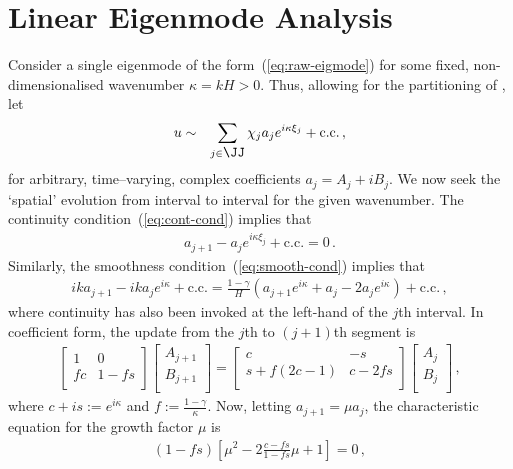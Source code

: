 \documentclass[12pt,a5paper]{article}
\begin{document}
\section{Linear Eigenmode Analysis}\label{sec:eig:modes}
Consider a single eigenmode of the form~(\ref{eq:raw-eigmode}) for some fixed, non-dimensionalised 
wavenumber $\kappa=kH>0$. 
Thus, allowing for the partitioning of \XX, let
\begin{eqnarray}
u & \sim & \sum_{j\in\JJ} \chi_j a_j e^{i\kappa\xi_j} + \text{c.c.}\,,
\end{eqnarray}
for arbitrary, time--varying, complex coefficients $a_j=A_j+iB_j$. 
We now seek the `spatial' evolution from interval to interval for the given wavenumber.
The continuity condition~(\ref{eq:cont-cond}) implies that
\begin{eqnarray}
a_{j+1} - a_j e^{i\kappa\xi_j} + \text{c.c.} = 0\,.
\end{eqnarray}
Similarly, the smoothness condition~(\ref{eq:smooth-cond}) implies that 
\begin{eqnarray}
ik a_{j+1} -ik a_j e^{i\kappa} + \text{c.c.} =  
\frac{1-\gamma}{H}\left(
a_{j+1} e^{i\kappa} + a_j - 2 a_j e^{i\kappa}
\right)
+ \text{c.c.}\,,
\end{eqnarray}
where continuity has also been invoked at the left-hand of the $j$th interval.
In coefficient form, the update from the $j$th to $(j+1)$th segment is
\begin{eqnarray}
\left[\begin{array}{cc}
1 & 0\\
fc & 1-fs\\
\end{array}\right]
\left[\begin{array}{c}
A_{j+1}\\
B_{j+1}\\
\end{array}\right]
=
\left[\begin{array}{cc}
c & -s\\
s+f(2c-1) & c-2fs\\
\end{array}\right]
\left[\begin{array}{c}
A_{j}\\
B_{j}\\
\end{array}\right]\,,
\end{eqnarray}
where $c+is:=e^{i\kappa}$ and $f:=\frac{1-\gamma}{\kappa}$.
Now, letting $a_{j+1}=\mu a_j$, the characteristic equation for 
the growth factor $\mu$ is
\begin{eqnarray}
(1-fs)\left[\mu^2-2\frac{c-fs}{1-fs}\mu+1\right] = 0\,,
\end{eqnarray}
\end{document}
